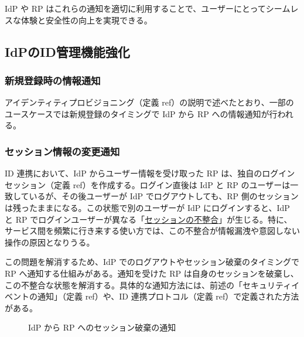 \documentclass[uplatex]{jsarticle}
\def\ref#1{ref}%
\def\label#1{}%
\begin{document}
IdP や RP はこれらの通知を適切に利用することで、ユーザーにとってシームレスな体験と安全性の向上を実現できる。

\subsection{IdPのID管理機能強化}\label{subsec:ch4-idp}

\subsubsection{新規登録時の情報通知}

アイデンティティプロビジョニング（定義 \ref{dfn:identity-provisioning}）の説明で述べたとおり、一部のユースケースでは新規登録のタイミングで IdP から RP への情報通知が行われる。

\subsubsection{セッション情報の変更通知}

ID 連携において、IdP からユーザー情報を受け取った RP は、独自のログインセッション（定義 \ref{dfn:login-session}）を作成する。ログイン直後は IdP と RP のユーザーは一致しているが、その後ユーザーが IdP でログアウトしても、RP 側のセッションは残ったままになる。この状態で別のユーザーが IdP にログインすると、IdP と RP でログインユーザーが異なる「\underline{セッションの不整合}」が生じる。特に、サービス間を頻繁に行き来する使い方では、この不整合が情報漏洩や意図しない操作の原因となりうる。

この問題を解消するため、IdP でのログアウトやセッション破棄のタイミングで RP へ通知する仕組みがある。通知を受けた RP は自身のセッションを破棄し、この不整合な状態を解消する。具体的な通知方法には、前述の「セキュリティイベントの通知」（定義 \ref{dfn:security-event-notification}）や、ID 連携プロトコル（定義 \ref{dfn:federation-protocol}）で定義された方法がある。

\begin{figure}[H]
\centering
{}
\caption{IdP から RP へのセッション破棄の通知}
\label{fig:ch4-session-revocation}
\end{figure}
\end{document}
